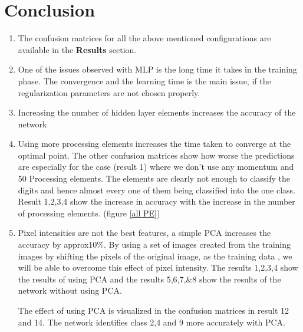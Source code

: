\documentclass[conference]{IEEEtran}
\begin{document}
\section{Conclusion}
\begin{enumerate}
\item The confusion matrices for all the above mentioned configurations are available in the \textbf{Results} section.
\item One of the issues observed with MLP is the long time it takes in the training phase. The convergence and the learning time is the main issue, if the regularization parameters are not chosen properly. 
\item Increasing the number of hidden layer elements increases the accuracy of the network
\item Using more processing elements increases the time taken to converge at the optimal point. The other confusion matrices show how worse the predictions are especially for the case (result 1) where we don't use any momentum and 50 Processing elements. The elements are clearly not enough to classify the digits and hence almost every one of them being classified into the one class. Result 1,2,3,4 show the increase in accuracy with the increase in the number of processing elements. (figure \ref{all PE})
\item  Pixel intensities are not the best features, a simple PCA increases the accuracy by approx10\%. By using a set of images created from the training images by shifting the pixels of the original image, as the training data \cite{Google Nets}, we will be able to overcome this effect of pixel intensity. The results 1,2,3,4 show the results of using PCA and the results 5,6,7,\&8 show the results of the network without using PCA.

The effect of using PCA is visualized in the confusion matrices in result 12 and 14. The network identifies class 2,4 and 9 more accurately with PCA. 


\end{enumerate}
\end{document}
